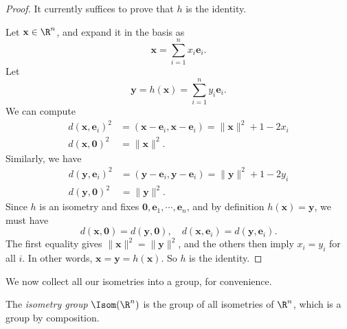 \documentclass[a4paper]{article}
\begin{document}
\begin{proof}
  It currently suffices to prove that $h$ is the identity.

  Let $\mathbf{x} \in \R^n$, and expand it in the basis as
  \[
    \mathbf{x} = \sum_{i = 1}^n x_i \mathbf{e}_i.
  \]
  Let
  \[
    \mathbf{y} = h(\mathbf{x}) = \sum_{i = 1}^n y_i \mathbf{e}_i.
  \]
  We can compute
  \begin{align*}
    d(\mathbf{x}, \mathbf{e}_i)^2 &= (\mathbf{x} - \mathbf{e}_i, \mathbf{x} - \mathbf{e}_i) = \|\mathbf{x}\|^2 + 1 - 2 x_i\\
    d(\mathbf{x}, \mathbf{0})^2 &= \|\mathbf{x}\|^2.
  \end{align*}
  Similarly, we have
  \begin{align*}
    d(\mathbf{y}, \mathbf{e}_i)^2 &= (\mathbf{y} - \mathbf{e}_i, \mathbf{y} - \mathbf{e}_i) = \|\mathbf{y}\|^2 + 1 - 2 y_i\\
    d(\mathbf{y}, \mathbf{0})^2 &= \|\mathbf{y}\|^2.
  \end{align*}
  Since $h$ is an isometry and fixes $\mathbf{0}, \mathbf{e}_1, \cdots, \mathbf{e}_n$, and by definition $h(\mathbf{x}) = \mathbf{y}$, we must have
  \[
    d(\mathbf{x}, \mathbf{0}) = d(\mathbf{y}, \mathbf{0}), \quad d(\mathbf{x}, \mathbf{e}_i) = d(\mathbf{y}, \mathbf{e}_i).
  \]
  The first equality gives $\|\mathbf{x}\|^2 = \|\mathbf{y}\|^2$, and the others then imply $x_i = y_i$ for all $i$. In other words, $\mathbf{x} = \mathbf{y} = h(\mathbf{x})$. So $h$ is the identity.
\end{proof}

We now collect all our isometries into a group, for convenience.
\begin{defi}
  The \emph{isometry group} $\Isom(\R^n)$ is the group of all isometries of $\R^n$, which is a group by composition.
\end{defi}
\end{document}
